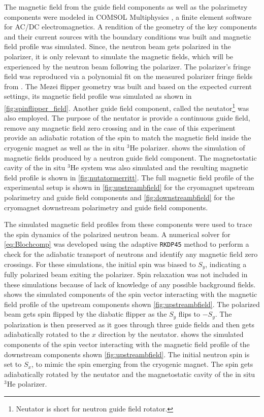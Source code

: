 The magnetic field from the guide field components as well as the polarimetry components were modeled in COMSOL Multiphysics \cite{COMSOL2019}, a finite element software for AC/DC electromagnetics. A rendition of the geometry of the key components and their current sources with the boundary conditions was built and magnetic field profile was simulated. Since, the neutron beam gets polarized in the polarizer, it is only relevant to simulate the magnetic fields, which will be experienced by the neutron beam following the polarizer. The polarizer's fringe field was reproduced via a polynomial fit on the measured polarizer fringe fields from \cite{Balascuta2012}. The Mezei flipper geometry was built and based on the expected current settings, its magnetic field profile was simulated as shown in \cref{fig:spinflipper_field}. Another guide field component, called the neutator\footnote{Neutator is short for neutron guide field rotator.} was also employed. The purpose of the neutator is provide a continuous guide field, remove any magnetic field zero crossing and in the case of this experiment provide an adiabatic rotation of the spin to match the magnetic field inside the cryogenic magnet as well as the in situ $^3$He polarizer.  shows the simulation of magnetic fields produced by a neutron guide field component. The magnetostatic cavity of the in situ $^3$He system was also simulated and the resulting magnetic field profile is shown in \cref{fig:nutatormerritt}. The full magnetic field profile of the experimental setup is shown in \cref{fig:upstreambfield} for the cryomagnet upstream polarimetry and guide field components and \cref{fig:downstreambfield} for the cryomagnet downstream polarimetry and guide field components. 

The simulated magnetic field profiles from these components were used to trace the spin dynamics of the polarized neutron beam. A numerical solver for \cref{eq:Blochcomp} was developed using the adaptive \texttt{RKDP45} method \cite{Dormand1980} to perform a check for the adiabatic transport of neutrons and identify any magnetic field zero crossings. For these simulations, the initial spin was biased to $S_y$, indicating a fully polarized beam exiting the polarizer. Spin relaxation was not included in these simulations because of lack of knowledge of any possible background fields.  shows the simulated components of the spin vector interacting with the magnetic field profile of the upstream components shown \cref{fig:upstreambfield}. The polarized beam gets spin flipped by the diabatic flipper as the $S_y$ flips to $-S_y$. The polarization is then preserved as it goes through three guide fields and then gets adiabatically rotated to the $x$ direction by the neutator.  shows the simulated components of the spin vector interacting with the magnetic field profile of the downstream components shown \cref{fig:upstreambfield}. The initial neutron spin is set to $S_x$, to mimic the spin emerging from the cryogenic magnet. The spin gets adiabatically rotated by the neutator and the magnetostatic cavity of the in situ $^3$He polarizer. 

